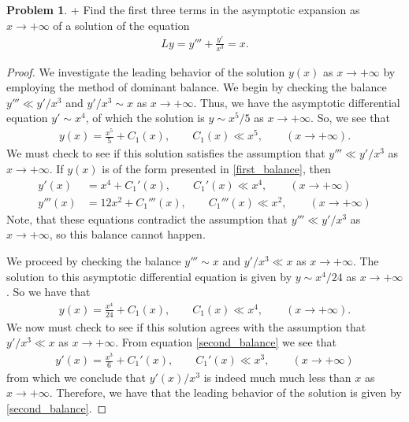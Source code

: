\documentclass[12pt]{article}
\theoremstyle{definition}
\newtheorem{problem}{Problem}
\begin{document}
\begin{problem}+
  Find the first three terms in the asymptotic expansion as $x \to +\infty$
  of a solution of the equation
  \begin{align*}
    Ly = y''' + \frac{y'}{x^3} = x.
  \end{align*}
\end{problem}

\begin{proof}
  We investigate the leading behavior of the solution $y(x)$ as $x\to + \infty$
  by employing the method of dominant balance. We begin by checking the balance
  $y''' \ll y'/x^3$ and $y'/x^3 \sim x$ as $x\to + \infty$. Thus, we have the asymptotic differential equation
  $y' \sim x^4$, of which the solution is $y \sim x^5/5$ as $x\to + \infty$. So, we see that
  \begin{align}\label{first_balance}
    y(x) = \frac{x^5}{5} + C_1(x), \qquad C_1(x) \ll x^5, \qquad (x\to+\infty).
  \end{align}
  We must check to see if this solution satisfies the assumption that $y''' \ll y'/x^3$ as $x\to + \infty$.
  If $y(x)$ is of the form presented in \eqref{first_balance}, then
  \begin{align*}
    y'(x) &= x^4 + C_1'(x), \qquad C_1'(x) \ll x^4, \qquad (x\to+\infty)  \\
    y'''(x) &= 12x^2 + C_1'''(x), \qquad C_1'''(x) \ll x^2, \qquad (x\to+\infty)
  \end{align*}
  Note, that these equations contradict the assumption that $y''' \ll y'/x^3$ as $x\to + \infty$, so this balance cannot happen.

  We proceed by checking the balance $y''' \sim x$ and $y' / x^3 \ll x$ as $x\to + \infty$. The solution to
  this asymptotic differential equation is given by $y \sim x^4 / 24$ as $x \to + \infty$. So we have that
  \begin{align}\label{second_balance}
    y(x) = \frac{x^4}{24} + C_1(x), \qquad C_1(x) \ll x^4, \qquad (x\to+\infty).
  \end{align}
  We now must check to see if this solution agrees with the assumption that $y' / x^3 \ll x$ as $x\to + \infty$.
  From equation \eqref{second_balance} we see that
  \begin{align*}
    y'(x) = \frac{x^3}{6} + C_1'(x), \qquad C_1'(x) \ll x^3, \qquad (x\to+\infty)
  \end{align*}
  from which we conclude that $y'(x)/x^3$ is indeed much much less than $x$ as $x\to + \infty$.
  Therefore, we have that the leading behavior of the solution is given by \eqref{second_balance}.


\end{proof}
\end{document}
